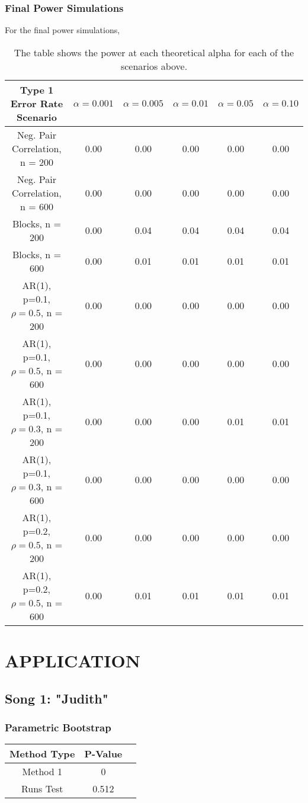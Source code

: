 \documentclass[12pt, letterpaper]{article}
\begin{document}
\subsubsection{Final Power Simulations}
For the final power simulations, 
\begin{table}[t]
\begin{center}
\begin{tabular}{|c|c|c|c|c|c|}
\hline
\textbf{Type 1 Error Rate Scenario} & $\alpha = 0.001$ &  $\alpha = 0.005$ &  $\alpha = 0.01$ &  $\alpha = 0.05$ &  $\alpha = 0.10$ \\
\hline
Neg. Pair Correlation, n = 200 & 0.00 & 0.00 & 0.00 & 0.00 & 0.00 \\
\hline
Neg. Pair Correlation, n = 600 & 0.00 & 0.00 & 0.00 & 0.00 & 0.00 \\
\hline
Blocks, n = 200 & 0.00 & 0.04 & 0.04 & 0.04 & 0.04 \\
\hline
Blocks, n = 600 & 0.00 & 0.01 & 0.01 & 0.01 & 0.01 \\
\hline
AR(1), p=0.1, $\rho = 0.5$, n = 200 & 0.00 & 0.00 & 0.00 & 0.00 & 0.00 \\
\hline
AR(1), p=0.1, $\rho = 0.5$, n = 600 & 0.00 & 0.00 & 0.00 & 0.00 & 0.00 \\
\hline
AR(1), p=0.1, $\rho = 0.3$, n = 200 & 0.00 & 0.00 & 0.00 & 0.01 & 0.01 \\
\hline
AR(1), p=0.1, $\rho = 0.3$, n = 600 & 0.00 & 0.00 & 0.00 & 0.00 & 0.00 \\
\hline
AR(1), p=0.2, $\rho = 0.5$, n = 200 & 0.00 & 0.00 & 0.00 & 0.00 & 0.00 \\
\hline
AR(1), p=0.2, $\rho = 0.5$, n = 600 & 0.00 & 0.01 & 0.01 & 0.01 & 0.01 \\
\hline
\end{tabular}
\end{center}
\caption{The table shows the power at each theoretical alpha for each of the scenarios above.}
\label{fig: Power Simulations using Nonparametric Bootstrap}
\end{table}

\section{APPLICATION}
\subsection{Song 1: "Judith"}

\subsubsection{Parametric Bootstrap}
\begin{tabular}{|c|c|c|}
\hline
\textbf{Method Type} & P-Value \\
\hline
Method 1 & 0 \\
\hline
Runs Test & 0.512 \\ 
\hline
\end{tabular}
\end{document}
